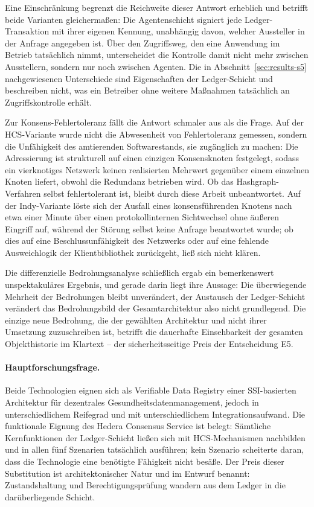 Eine Einschränkung begrenzt die Reichweite dieser Antwort erheblich und betrifft beide Varianten gleichermaßen: Die Agentenschicht signiert jede Ledger-Transaktion mit ihrer eigenen Kennung, unabhängig davon, welcher Aussteller in der Anfrage angegeben ist. Über den Zugriffsweg, den eine Anwendung im Betrieb tatsächlich nimmt, unterscheidet die Kontrolle damit nicht mehr zwischen Ausstellern, sondern nur noch zwischen Agenten. Die in Abschnitt~\ref{sec:results-s5} nachgewiesenen Unterschiede sind Eigenschaften der Ledger-Schicht und beschreiben nicht, was ein Betreiber ohne weitere Maßnahmen tatsächlich an Zugriffskontrolle erhält.

Zur Konsens-Fehlertoleranz fällt die Antwort schmaler aus als die Frage. Auf der HCS-Variante wurde nicht die Abwesenheit von Fehlertoleranz gemessen, sondern die Unfähigkeit des amtierenden Softwarestands, sie zugänglich zu machen: Die Adressierung ist strukturell auf einen einzigen Konsensknoten festgelegt, sodass ein vierknotiges Netzwerk keinen realisierten Mehrwert gegenüber einem einzelnen Knoten liefert, obwohl die Redundanz betrieben wird. Ob das Hashgraph-Verfahren selbst fehlertolerant ist, bleibt durch diese Arbeit unbeantwortet. Auf der Indy-Variante löste sich der Ausfall eines konsensführenden Knotens nach etwa einer Minute über einen protokollinternen Sichtwechsel ohne äußeren Eingriff auf, während der Störung selbst keine Anfrage beantwortet wurde; ob dies auf eine Beschlussunfähigkeit des Netzwerks oder auf eine fehlende Ausweichlogik der Klientbibliothek zurückgeht, ließ sich nicht klären.

Die differenzielle Bedrohungsanalyse schließlich ergab ein bemerkenswert unspektakuläres Ergebnis, und gerade darin liegt ihre Aussage: Die überwiegende Mehrheit der Bedrohungen bleibt unverändert, der Austausch der Ledger-Schicht verändert das Bedrohungsbild der Gesamtarchitektur also nicht grundlegend. Die einzige neue Bedrohung, die der gewählten Architektur und nicht ihrer Umsetzung zuzuschreiben ist, betrifft die dauerhafte Einsehbarkeit der gesamten Objekthistorie im Klartext -- der sicherheitsseitige Preis der Entscheidung E5.

\paragraph{Hauptforschungsfrage.} Beide Technologien eignen sich als Verifiable Data Registry einer SSI-basierten Architektur für dezentrales Gesundheitsdatenmanagement, jedoch in unterschiedlichem Reifegrad und mit unterschiedlichem Integrationsaufwand. Die funktionale Eignung des Hedera Consensus Service ist belegt: Sämtliche Kernfunktionen der Ledger-Schicht ließen sich mit HCS-Mechanismen nachbilden und in allen fünf Szenarien tatsächlich ausführen; kein Szenario scheiterte daran, dass die Technologie eine benötigte Fähigkeit nicht besäße. Der Preis dieser Substitution ist architektonischer Natur und im Entwurf benannt: Zustandshaltung und Berechtigungsprüfung wandern aus dem Ledger in die darüberliegende Schicht.

